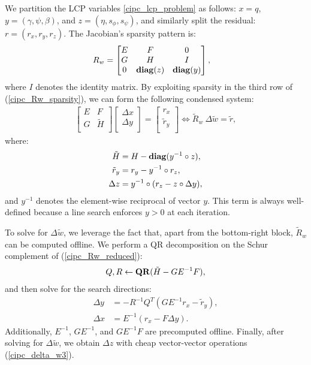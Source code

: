 We partition the LCP variables \eqref{cipc_lcp_problem} as follows: $x = q$, $y = (\gamma, \psi, \beta)$, and $z = (\eta, s_{\phi}, s_{\psi})$, and similarly split the residual: $r = (r_x, r_y, r_z)$. The Jacobian's sparsity pattern is:
\begin{align}
	R_w &= \begin{bmatrix}
		E & F & 0 \\
		G & H & I \\
		0 & \mbox{\textbf{diag}}(z) & \mbox{\textbf{diag}}(y)
	\end{bmatrix}, \label{cipc_Rw_sparsity}
\end{align}
where $I$ denotes the identity matrix. By exploiting sparsity in the third row of (\ref{cipc_Rw_sparsity}), we can form the following condensed system:
\begin{align}
	\begin{bmatrix}
		E & F \\
		G & \tilde{H} \\
	\end{bmatrix}
	\begin{bmatrix}
		\Delta x \\
		\Delta y \\
	\end{bmatrix}
	= 
	\begin{bmatrix}
		r_x \\
		\tilde{r}_y \\
	\end{bmatrix} \Leftrightarrow \tilde{R}_w \: \Delta \tilde{w} = \tilde{r},
	\label{cipc_Rw_reduced}
\end{align}
where:
\begin{align}
	\tilde{H} &= H - \mbox{\textbf{diag}}(y^{-1} \circ z), \\
	\tilde{r}_y &= r_y - y^{-1} \circ r_z, \\
	\Delta z &= y^{-1} \circ (r_z - z \circ \Delta y),
	\label{cipc_delta_w3}
\end{align}
and $y^{-1}$ denotes the element-wise reciprocal of vector $y$. This term is always well-defined because a line search enforces $y > 0$ at each iteration. 

To solve for $\Delta \tilde{w}$, we leverage the fact that, apart from the bottom-right block, $\tilde{R}_w$ can be computed offline. We perform a QR decomposition on the Schur complement of (\ref{cipc_Rw_reduced}): 
\begin{align}
	Q, R \leftarrow \mbox{\textbf{QR}}(\tilde{H} - G E^{-1} F),
\end{align}
and then solve for the search directions:
\begin{align}
	\Delta y &= - R^{-1} Q^T (G E^{-1} r_x - \tilde{r}_y), \\
	\Delta x & = E^{-1} (r_x - F \Delta y).
\end{align}
Additionally, $E^{-1}$, $G E^{-1}$, and $G E^{-1} F$ are precomputed offline. Finally, after solving for $\Delta \tilde{w}$, we obtain $\Delta z$ with cheap vector-vector operations (\ref{cipc_delta_w3}).

